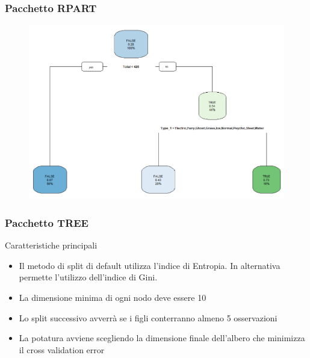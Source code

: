 	\begin{frame}
		\frametitle{Pacchetto RPART}
		\begin{center}
			\begin{figure}
				
			\end{figure}
			\begin{figure}
				\includegraphics[scale=0.3]{img/rpartEntrpr}
			\end{figure}
		\end{center}
	\end{frame}


	\begin{frame}
		\frametitle{Pacchetto TREE}
		\begin{block}{Caratteristiche principali}
			\begin{itemize}
				\item Il metodo di split di default utilizza l'indice di Entropia. In alternativa permette l'utilizzo dell'indice di Gini.
				\item La dimensione minima di ogni nodo deve essere 10
				\item Lo split successivo avverrà se i figli conterranno almeno 5 osservazioni	
				\item La potatura avviene scegliendo la dimensione finale dell'albero che minimizza il cross validation error
			\end{itemize}
		\end{block}
	\end{frame}

